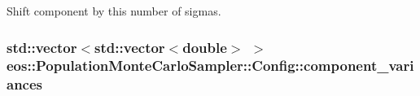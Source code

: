 Shift component by this number of sigmas. \hypertarget{structeos_1_1PopulationMonteCarloSampler_1_1Config_af7452d7aaa3b241039b730998cdbabff}{
\subsubsection[{component\_\-variances}]{\setlength{\rightskip}{0pt plus 5cm}std::vector$<$std::vector$<$double$>$ $>$ {\bf eos::PopulationMonteCarloSampler::Config::component\_\-variances}}}
\label{structeos_1_1PopulationMonteCarloSampler_1_1Config_af7452d7aaa3b241039b730998cdbabff}


